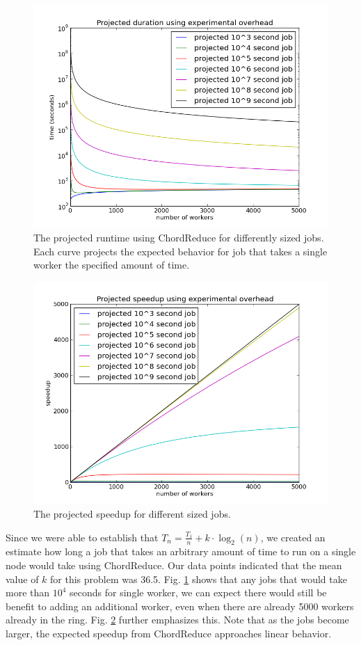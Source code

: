\begin{figure}
	\centering
	\includegraphics[width=0.5\linewidth]{figs/projTime}
	\caption{The projected runtime using ChordReduce for differently sized jobs.  Each curve projects the expected behavior for job that takes a single worker the specified amount of time.}
	\label{fig:projTime}
\end{figure}

\begin{figure}
	\centering
	\includegraphics[width=0.5\linewidth]{figs/projSpeed}
	\caption{The projected speedup for different sized jobs. }
	\label{fig:projSpeed}
\end{figure}

Since we were able to establish that $T_{n} = \frac{T_{1}}{n} + k \cdot \log_{2}(n)$, we created an estimate how long a job that takes an arbitrary amount of time to run on a single node would take using ChordReduce.  
Our data points indicated that the mean value of $k$ for this problem was 36.5.  
Fig. \ref{fig:projTime} shows that any jobs that would take more than $10^{4}$ seconds for single worker, we can expect there would still be benefit to adding an additional worker, even when there are already 5000 workers already in the ring.  
Fig. \ref{fig:projSpeed} further emphasizes this. Note that as the jobs become larger, the expected speedup from ChordReduce  approaches linear behavior.



